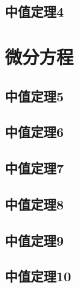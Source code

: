 \documentclass[no-math]{lecture}
\begin{document}
	\section{中值定理4}
\newpage
	\chapter{微分方程}
	\section{中值定理5}
	\section{中值定理6}
	\section{中值定理7}
	\section{中值定理8}
	\section{中值定理9}
	\section{中值定理10}
\end{document}
